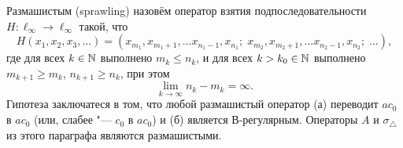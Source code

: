\begin{hypothesis}
	Размашистым (sprawling)
	назовём оператор взятия подпоследовательности $H:\ell_\infty \to \ell_\infty$ такой, что
	\begin{equation}
		H(x_1,x_2, x_3, ...) =
		(
		x_{m_1},x_{m_1+1},...x_{n_1-1},x_{n_1};\;
		x_{m_2},x_{m_2+1},...x_{n_2-1},x_{n_2};\;
		...)
		,
	\end{equation}
	где для всех $k\in\mathbb{N}$ выполнено $m_k\leq n_k$,
	и для всех $k > k_0 \in \mathbb{N}$ выполнено
	$m_{k+1} \geq m_k$, $n_{k+1} \geq n_k$,
	при этом
	\begin{equation}
		\lim_{k\to\infty} n_k - m_k = \infty
		.
	\end{equation}
	Гипотеза заключатеся в том, что любой размашистый оператор
	(а) переводит $ac_0$ в $ac_0$ (или, слабее "--- $c_0$ в $ac_0$) и
	(б) является В-регулярным.
	Операторы $A$ и $\sigma_\triangle$ из этого параграфа являются размашистыми.
\end{hypothesis}
